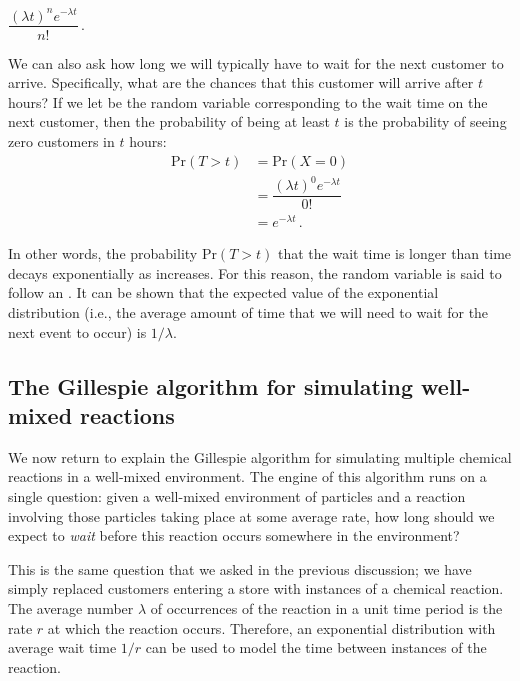 \begin{center}
$\dfrac{(\lambda t)^n e^{-\lambda t}}{n!}$\,.
\end{center}

We can also ask how long we will typically have to wait for the next customer to arrive. Specifically, what are the chances that this customer will arrive after $t$ hours? If we let  be the random variable corresponding to the wait time on the next customer, then the probability of  being at least $t$ is the probability of seeing zero customers in $t$ hours:
\begin{align*}
\mathrm{Pr}(T > t) &= \mathrm{Pr}(X = 0)\\
& = \dfrac{(\lambda t)^0 e^{-\lambda t}}{0!}\\
& = e^{-\lambda t}\,.
\end{align*}

In other words, the probability $\mathrm{Pr}(T > t)$ that the wait time is longer than time  decays exponentially as  increases. For this reason, the random variable  is said to follow an . It can be shown that the expected value of the exponential distribution (i.e., the average amount of time that we will need to wait for the next event to occur) is $1/\lambda$.\\

\begin{qbox}\end{qbox}

\FloatBarrier
{}
\subsection{The Gillespie algorithm for simulating well-mixed reactions}

We now return to explain the Gillespie algorithm for simulating multiple chemical reactions in a well-mixed environment. The engine of this algorithm runs on a single question: given a well-mixed environment of particles and a reaction involving those particles taking place at some average rate, how long should we expect to \textit{wait} before this reaction occurs somewhere in the environment?

This is the same question that we asked in the previous discussion; we have simply replaced customers entering a store with instances of a chemical reaction. The average number $\lambda$ of occurrences of the reaction in a unit time period is the rate $r$ at which the reaction occurs. Therefore, an exponential distribution with average wait time $1/r$ can be used to model the time between instances of the reaction.

